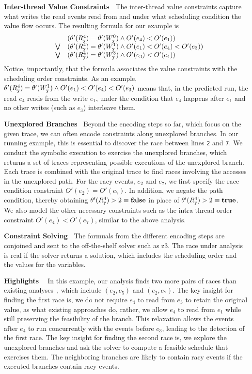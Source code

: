 {\bf Inter-thread Value Constraints\ } The inter-thread value constraints capture what writes the read events read from and under what scheduling condition the value flow occurs.  The resulting formula for our example is
$$
\begin{array}{lcl}
	& & (\theta'(R_{\tt y}^4)=\theta'(W_{\tt y}^0) \wedge O'(e_4) < O'(e_1) ) \\
& \bigvee &
	(\theta'(R_{\tt y}^4)=\theta'(W_{\tt y}^1) \wedge O'(e_1) < O'(e_4) < O'(e_3)) \\
& \bigvee &
	(\theta'(R_{\tt y}^4)=\theta'(W_{\tt y}^3) \wedge O'(e_3) < O'(e_4))
\end{array}
$$    
Notice, importantly, that the formula associates the value constraints with the scheduling order constraints. 
 As an example, 
$\theta'(R_{\tt y}^4)=\theta'(W_{\tt y}^1) \wedge O'(e_1) < O'(e_4) < O'(e_3)$ means that, in the predicted run, the read $e_4$ reads from the write $e_1$, under the condition that $e_4$ happens after $e_1$ and no other  writes (such as $e_3$) interleave them.



{\bf Unexplored Branches\ } Beyond the encoding steps so far, which focus on the given trace, we can often encode constraints along unexplored branches. In our running example, this is essential to discover the race between lines {\tt 2} and {\tt 7}. We conduct the symbolic execution to exercise the unexplored branches, which returns a set of traces representing possible executions of the unexplored branch. Each trace is combined with the original trace to find races involving the accesses in the unexplored path. For the racy events, $e_2$ and $e_7$, we first specify the race condition constraint  $O'(e_2)=O'(e_7)$. In addition, we negate the path condition, thereby obtaining $\theta'(R_{\tt y}^4) > 2 \equiv {\bf false}$ in place of $\theta'(R_{\tt y}^4) > 2 \equiv {\bf true}$. We also model the other necessary constraints such as the intra-thread order constraint $O'(e_4) < O'(e_7)$, similar to the above analysis.

{\bf Constraint Solving\ } The formuals from the different encoding steps are conjoined and sent to the off-the-shelf solver such as {\sf z3}.  The race under analysis is real if the solver returns a solution, which includes the scheduling order and the values for the variables. 

{\bf Highlights \ } In this example, our analysis finds two more pairs of races than existing analyses~\cite{yannis, jeff}, which include $(e_2, e_5)$ and $(e_2, e_7)$.
The key insight for finding the first race is, we do not require $e_4$ to read from $e_3$ to retain the original value, as what existing approaches do, rather, we allow $e_4$ to read from $e_1$ while still preserving the feasibility of the branch. This relaxation allows the events after $e_4$ to run concurrently with the events before $e_3$, leading to the detection of the first race.  The key insight for finding the second race is, we explore the unexplored branches and ask the solver to compute a feasible schedule that exercises them. The neighboring branches are likely to contain racy events if the executed branches contain racy events.

 
